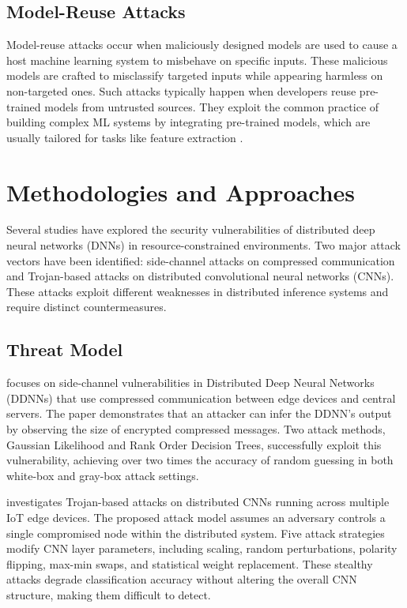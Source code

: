 \documentclass[conference]{IEEEtran}
\begin{document}
\subsection{Model-Reuse Attacks}
Model-reuse attacks occur when maliciously designed models are used to cause a host machine learning system to misbehave on specific inputs. These malicious models are crafted to misclassify targeted inputs while appearing harmless on non-targeted ones. Such attacks typically happen when developers reuse pre-trained models from untrusted sources. They exploit the common practice of building complex ML systems by integrating pre-trained models, which are usually tailored for tasks like feature extraction \cite{ji2018model}.






\section{Methodologies and Approaches}

Several studies have explored the security vulnerabilities of distributed deep neural networks (DNNs) in resource-constrained environments. Two major attack vectors have been identified: side-channel attacks on compressed communication and Trojan-based attacks on distributed convolutional neural networks (CNNs). These attacks exploit different weaknesses in distributed inference systems and require distinct countermeasures.

\subsection{Threat Model}
\cite{kannan2024security} focuses on side-channel vulnerabilities in Distributed Deep Neural Networks (DDNNs) that use compressed communication between edge devices and central servers. The paper demonstrates that an attacker can infer the DDNN’s output by observing the size of encrypted compressed messages. Two attack methods, Gaussian Likelihood and Rank Order Decision Trees, successfully exploit this vulnerability, achieving over two times the accuracy of random guessing in both white-box and gray-box attack settings.

\cite{mohammed2020secure} investigates Trojan-based attacks on distributed CNNs running across multiple IoT edge devices. The proposed attack model assumes an adversary controls a single compromised node within the distributed system. Five attack strategies modify CNN layer parameters, including scaling, random perturbations, polarity flipping, max-min swaps, and statistical weight replacement. These stealthy attacks degrade classification accuracy without altering the overall CNN structure, making them difficult to detect.
\end{document}
